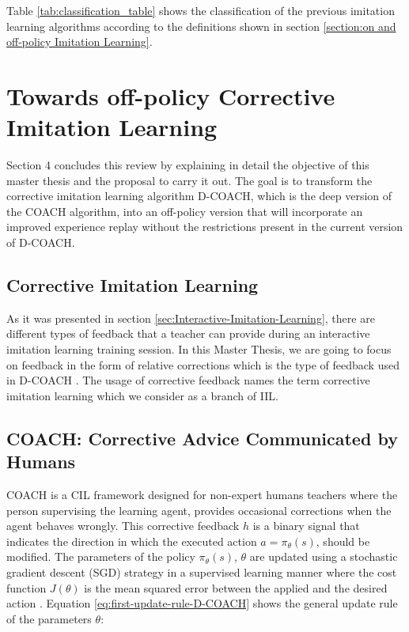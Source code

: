 Table \ref{tab:classification_table} shows the classification of the previous imitation learning algorithms according to the definitions shown in section \ref{section:on and off-policy Imitation Learning}.






\section{Towards off-policy Corrective Imitation Learning}
\label{section:Towards-off-policy-CIL}


Section 4 concludes this review by explaining in detail the objective of this master thesis and the proposal to carry it out. 
The goal is to transform the corrective imitation learning algorithm D-COACH, which is the deep version of the COACH algorithm, into an off-policy version that will incorporate an improved experience replay without the restrictions present in the current version of D-COACH.


\subsection{Corrective Imitation Learning}
\label{sec:Corrective-Imitation-Learning}


As it was presented in section \ref{sec:Interactive-Imitation-Learning}, there are different types of feedback that a teacher can provide during an interactive imitation learning training session. In this Master Thesis, we are going to focus on feedback in the form of relative corrections which is the type of feedback used in D-COACH \cite{D-COACH-Dattari-Celemin-Ruiz-del-Solar-Kober:2018}. The usage of corrective feedback names the term corrective imitation learning which we consider as a branch of IIL.


\subsection{COACH: Corrective Advice Communicated by Humans}
\label{sec:COACH}

COACH \cite{COACH-Celemin-Ruiz-del-Solar:2015} is a CIL framework designed for non-expert humans teachers where the person supervising the learning agent, provides occasional corrections when the agent behaves wrongly. This corrective feedback $h$ is a binary signal that indicates the direction in which the executed action $a = \pi_\theta(s)$, should be modified.
The parameters of the policy $\pi_\theta(s)$, $\theta$ are updated using a stochastic gradient descent (SGD) strategy in a supervised learning manner where the cost function $J(\theta)$ is the mean squared error between the applied and the desired action \cite{Gaussian-COACH-wout:2019}. Equation \ref{eq:first-update-rule-D-COACH} shows the general update rule of the parameters $\theta$:


